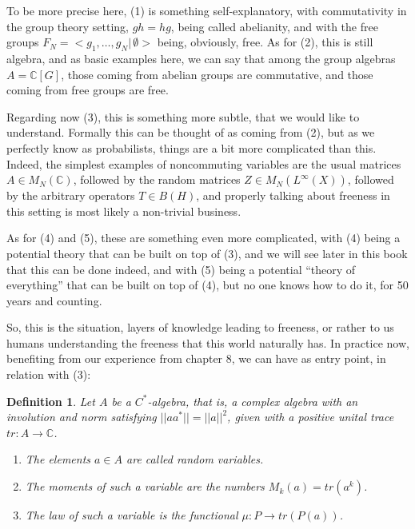 \documentclass[12pt]{amsbook}
\newtheorem{definition}[theorem]{Definition}
\begin{document}
To be more precise here, (1) is something self-explanatory, with commutativity in the group theory setting, $gh=hg$, being called abelianity, and with the free groups $F_N=<g_1,\ldots,g_N|\,\emptyset>$ being, obviously, free. As for (2), this is still algebra, and as basic examples here, we can say that among the group algebras $A=\mathbb C[G]$, those coming from abelian groups are commutative, and those coming from free groups are free.

\bigskip

Regarding now (3), this is something more subtle, that we would like to understand. Formally this can be thought of as coming from (2), but as we perfectly know as probabilists, things are a bit more complicated than this. Indeed, the simplest examples of noncommuting variables are the usual matrices $A\in M_N(\mathbb C)$, followed by the random matrices $Z\in M_N(L^\infty(X))$, followed by the arbitrary operators $T\in B(H)$, and properly talking about freeness in this setting is most likely a non-trivial business. 

\bigskip

As for (4) and (5), these are something even more complicated, with (4) being a potential theory that can be built on top of (3), and we will see later in this book that this can be done indeed, and with (5) being a potential ``theory of everything'' that can be built on top of (4), but no one knows how to do it, for 50 years and counting.

\bigskip

So, this is the situation, layers of knowledge leading to freeness, or rather to us humans understanding the freeness that this world naturally has. In practice now, benefiting from our experience from chapter 8, we can have as entry point, in relation with (3):


\begin{definition}
Let $A$ be a $C^*$-algebra, that is, a complex algebra with an involution and norm satisfying $||aa^*||=||a||^2$, given with a positive unital trace $tr:A\to\mathbb C$.
\begin{enumerate}
\item The elements $a\in A$ are called random variables.

\item The moments of such a variable are the numbers $M_k(a)=tr(a^k)$.

\item The law of such a variable is the functional $\mu:P\to tr(P(a))$.
\end{enumerate}
\end{definition}
\end{document}
